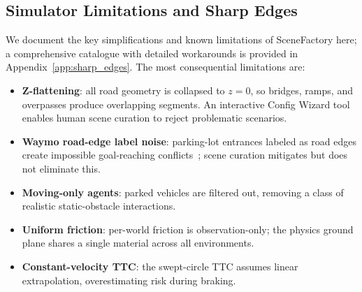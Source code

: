 
\subsection{Simulator Limitations and Sharp Edges}
\label{sec:sharp_edges}

We document the key simplifications and known limitations of SceneFactory here; a comprehensive catalogue with detailed workarounds is provided in Appendix~\ref{app:sharp_edges}.
The most consequential limitations are:
\begin{itemize}[leftmargin=*, itemsep=1pt]
  \item \textbf{Z-flattening}: all road geometry is collapsed to $z{=}0$, so bridges, ramps, and overpasses produce overlapping segments.  An interactive Config Wizard tool enables human scene curation to reject problematic scenarios.
  \item \textbf{Waymo road-edge label noise}: parking-lot entrances labeled as road edges create impossible goal-reaching conflicts~\cite{kazemkhani_gpudrive_2025}; scene curation mitigates but does not eliminate this.
  \item \textbf{Moving-only agents}: parked vehicles are filtered out, removing a class of realistic static-obstacle interactions.
  \item \textbf{Uniform friction}: per-world friction is observation-only; the physics ground plane shares a single material across all environments.
  \item \textbf{Constant-velocity TTC}: the swept-circle TTC assumes linear extrapolation, overestimating risk during braking.
\end{itemize}
